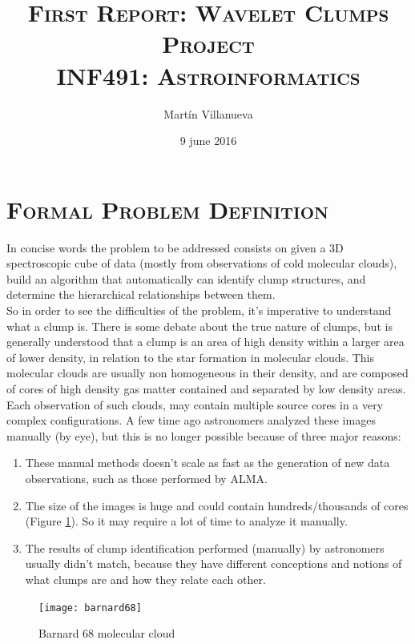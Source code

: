 \documentclass[letter, 11pt]{article}
\title{\textsc{First Report: Wavelet Clumps Project} \\
    \textsc{INF491: Astroinformatics}}
\author{Martín Villanueva}
\date{9 june 2016}
\begin{document}
\maketitle





\section{\textsc{Formal Problem Definition}}

In concise words the problem to be addressed consists on given a 3D spectroscopic cube of data (mostly from observations of cold molecular clouds), build an algorithm that automatically can identify clump structures, and determine the hierarchical relationships between them.\\

So in order to see the difficulties of the problem, it's imperative to understand what a clump is. There is some debate about the true nature of clumps, but is generally understood that a clump is an area of high density within a larger area of lower density, in relation to the star formation in molecular clouds. This molecular clouds are usually non homogeneous in their density, and are composed of cores of high density gas matter contained and separated by low density areas. Each observation of such clouds, may contain multiple source cores in a very complex configurations. A few time ago astronomers analyzed these images manually (by eye), but this is no longer possible because of three major reasons:
\begin{enumerate}
    \item These manual methods doesn't scale as fast as the generation of new data observations, such as those performed by ALMA.
    \item The size of the images is huge and could contain hundreds/thousands of cores (Figure \ref{fig:barnard68}). So it may require a lot of time to analyze it manually.
    \item The results of clump identification performed (manually) by astronomers usually didn't match, because they have different conceptions and notions of what clumps are and how they relate each other.
\end{enumerate}

\begin{figure}[htpb!]
\centering
\texttt{[image: barnard68]}
\caption{Barnard 68 molecular cloud}
\label{fig:barnard68}
\end{figure}
\end{document}
